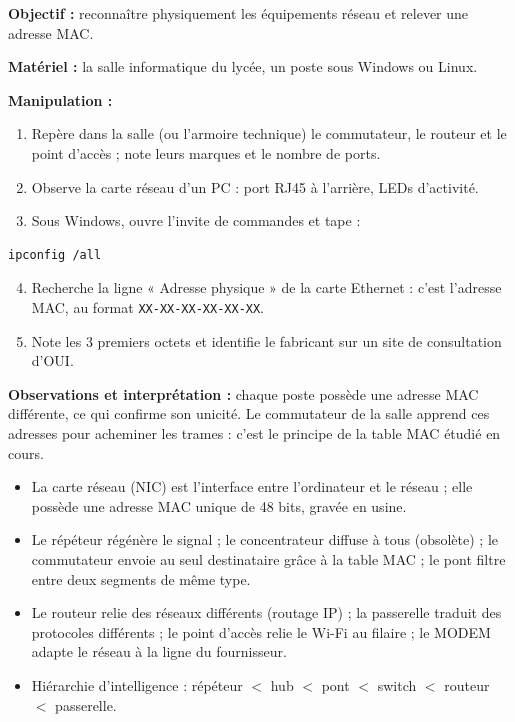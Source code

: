 \documentclass[11pt]{article}
\newcommand{\cle}[1]{{\popxbold\color{popdark}#1}}
\begin{document}
\begin{experience}
\textbf{Objectif :} reconnaître physiquement les équipements réseau et relever une adresse MAC.

\textbf{Matériel :} la salle informatique du lycée, un poste sous Windows ou Linux.

\textbf{Manipulation :}
\begin{enumerate}
\item Repère dans la salle (ou l'armoire technique) le commutateur, le routeur et le point d'accès ; note leurs marques et le nombre de ports.
\item Observe la carte réseau d'un PC : port RJ45 à l'arrière, LEDs d'activité.
\item Sous Windows, ouvre l'invite de commandes et tape :
\end{enumerate}
\begin{lstlisting}
ipconfig /all
\end{lstlisting}
\begin{enumerate}
\setcounter{enumi}{3}
\item Recherche la ligne « Adresse physique » de la carte Ethernet : c'est l'adresse MAC, au format \texttt{XX-XX-XX-XX-XX-XX}.
\item Note les 3 premiers octets et identifie le fabricant sur un site de consultation d'OUI.
\end{enumerate}

\textbf{Observations et interprétation :} chaque poste possède une adresse MAC différente, ce qui confirme son unicité. Le commutateur de la salle apprend ces adresses pour acheminer les trames : c'est le principe de la table MAC étudié en cours.
\end{experience}

\begin{aretenir}
\begin{itemize}
\item La \cle{carte réseau} (NIC) est l'interface entre l'ordinateur et le réseau ; elle possède une \cle{adresse MAC} unique de 48 bits, gravée en usine.
\item Le \cle{répéteur} régénère le signal ; le \cle{concentrateur} diffuse à tous (obsolète) ; le \cle{commutateur} envoie au seul destinataire grâce à la table MAC ; le \cle{pont} filtre entre deux segments de même type.
\item Le \cle{routeur} relie des réseaux différents (routage IP) ; la \cle{passerelle} traduit des protocoles différents ; le \cle{point d'accès} relie le Wi-Fi au filaire ; le \cle{MODEM} adapte le réseau à la ligne du fournisseur.
\item Hiérarchie d'intelligence : répéteur $<$ hub $<$ pont $<$ switch $<$ routeur $<$ passerelle.
\end{itemize}
\end{aretenir}
\end{document}
